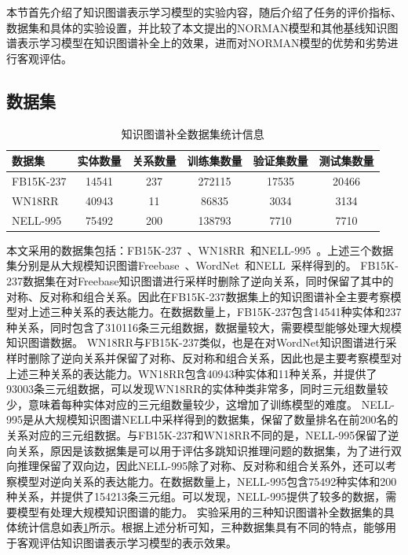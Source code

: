 \documentclass[algorithmlist, AutoFakeBold, AutoFakeSlant, figurelist, tablelist, nomlist, engineering]{seuthesix}
\begin{document}
本节首先介绍了知识图谱表示学习模型的实验内容，随后介绍了任务的评价指标、数据集和具体的实验设置，并比较了本文提出的NORMAN模型和其他基线知识图谱表示学习模型在知识图谱补全上的效果，进而对NORMAN模型的优势和劣势进行客观评估。

\subsection{数据集}
\begin{table}[t]
  \centering
  \caption{知识图谱补全数据集统计信息}
  \begin{tabular*}{0.95\textwidth}{@{\extracolsep{\fill}}lccccc}
    \toprule[1pt]
    数据集 & 实体数量 & 关系数量 & 训练集数量 & 验证集数量 & 测试集数量 \\ \hline
    FB15K-237 & 14541 & 237 & 272115 & 17535 & 20466\\
    WN18RR & 40943 & 11 & 86835 & 3034 & 3134\\
    NELL-995 & 75492 & 200 & 138793 & 7710 & 7710\\
    \bottomrule[1pt]
	\end{tabular*}
  \label{Datasets1}
\end{table}
本文采用的数据集包括：FB15K-237~\cite{toutanova2015representing}、WN18RR~\cite{dettmers2018convolutional}和NELL-995~\cite{xiong2017deeppath}。上述三个数据集分别是从大规模知识图谱Freebase~\cite{bollacker2008freebase}、WordNet~\cite{glorot2010understanding}和NELL~\cite{carlson2010toward}采样得到的。
FB15K-237数据集在对Freebase知识图谱进行采样时删除了逆向关系，同时保留了其中的对称、反对称和组合关系。因此在FB15K-237数据集上的知识图谱补全主要考察模型对上述三种关系的表达能力。在数据数量上，FB15K-237包含14541种实体和237种关系，同时包含了310116条三元组数据，数据量较大，需要模型能够处理大规模知识图谱数据。
WN18RR与FB15K-237类似，也是在对WordNet知识图谱进行采样时删除了逆向关系并保留了对称、反对称和组合关系，因此也是主要考察模型对上述三种关系的表达能力。WN18RR包含40943种实体和11种关系，并提供了93003条三元组数据，可以发现WN18RR的实体种类非常多，同时三元组数量较少，意味着每种实体对应的三元组数量较少，这增加了训练模型的难度。
NELL-995是从大规模知识图谱NELL中采样得到的数据集，保留了数量排名在前200名的关系对应的三元组数据。与FB15K-237和WN18RR不同的是，NELL-995保留了逆向关系，原因是该数据集是可以用于评估多跳知识推理问题的数据集，为了进行双向推理保留了双向边，因此NELL-995除了对称、反对称和组合关系外，还可以考察模型对逆向关系的表达能力。在数据数量上，NELL-995包含75492种实体和200种关系，并提供了154213条三元组。可以发现，NELL-995提供了较多的数据，需要模型有处理大规模知识图谱的能力。
实验采用的三种知识图谱补全数据集的具体统计信息如表\ref{Datasets1}所示。根据上述分析可知，三种数据集具有不同的特点，能够用于客观评估知识图谱表示学习模型的表示效果。
\end{document}
